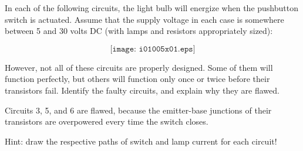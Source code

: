 

In each of the following circuits, the light bulb will energize when the pushbutton switch is actuated.  Assume that the supply voltage in each case is somewhere between 5 and 30 volts DC (with lamps and resistors appropriately sized):

$$\texttt{[image: i01005x01.eps]}$$

However, not all of these circuits are properly designed.  Some of them will function perfectly, but others will function only once or twice before their transistors fail.  Identify the faulty circuits, and explain why they are flawed.







Circuits 3, 5, and 6 are flawed, because the emitter-base junctions of their transistors are overpowered every time the switch closes.

\vskip 10pt

Hint: draw the respective paths of switch and lamp current for each circuit!











